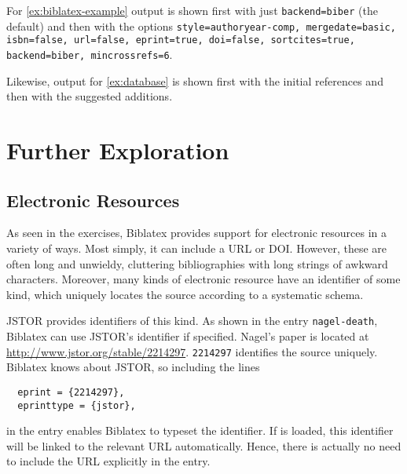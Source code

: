 For \cref{ex:biblatex-example} output is shown first with just \texttt{backend=biber} (the default) and then with the options \texttt{style=authoryear-comp, mergedate=basic, isbn=false, url=false, eprint=true, doi=false, sortcites=true, backend=biber, mincrossrefs=6}.

Likewise, output for \cref{ex:database} is shown first with the initial references and then with the suggested additions.



{\centering
  \par
  \par
}


\section<1-| beamer:0>{Further Exploration}\label{sec:pellach}

\subsection{Electronic Resources}\label{subsec:eres}

As seen in the exercises, Biblatex provides support for electronic resources in a variety of ways.
Most simply, it can include a URL or DOI.
However, these are often long and unwieldy, cluttering bibliographies with long strings of awkward characters.
Moreover, many kinds of electronic resource have an identifier of some kind, which uniquely locates the source according to a systematic schema.

JSTOR provides identifiers of this kind.
As shown in the entry \verb|nagel-death|, Biblatex can use JSTOR's identifier if specified.
Nagel's paper is located at \url{http://www.jstor.org/stable/2214297}.
\texttt{2214297} identifies the source uniquely.
Biblatex knows about JSTOR, so including the lines
\begin{verbatim}
  eprint = {2214297},
  eprinttype = {jstor},
\end{verbatim}
in the entry enables Biblatex to typeset the identifier.
If  is loaded, this identifier will be linked to the relevant URL automatically.
Hence, there is actually no need to include the URL explicitly in the entry.

